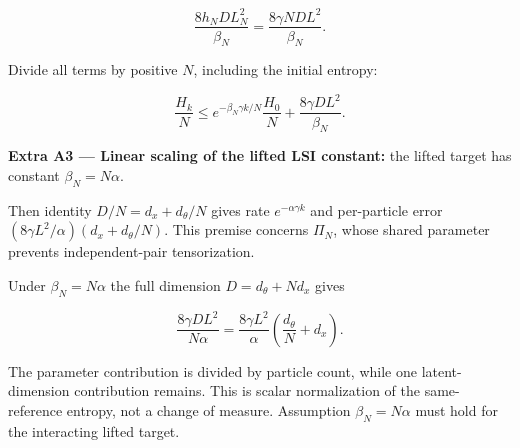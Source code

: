 \documentclass[11pt,a4paper]{report}
\begin{document}
\[\frac{8h_NDL_N^2}{\beta_N}
=\frac{8\gamma NDL^2}{\beta_N}.\]

Divide all terms by positive \(N\), including the initial entropy:

\[\frac{H_k}N\le e^{-\beta_N\gamma k/N}\frac{H_0}N
+\frac{8\gamma DL^2}{\beta_N}.\]

\textbf{Extra A3 — Linear scaling of the lifted LSI constant:} the lifted target has constant \(\beta_N=N\alpha\).



Then identity \(D/N=d_x+d_\theta/N\) gives rate \(e^{-\alpha\gamma k}\) and per-particle error \((8\gamma L^2/\alpha)(d_x+d_\theta/N)\). This premise concerns \(\Pi_N\), whose shared parameter prevents independent-pair tensorization.



Under \(\beta_N=N\alpha\) the full dimension \(D=d_\theta+Nd_x\) gives

\[\frac{8\gamma DL^2}{N\alpha}
=\frac{8\gamma L^2}{\alpha}\left(\frac{d_\theta}{N}+d_x\right).\]

The parameter contribution is divided by particle count, while one latent-dimension contribution remains. This is scalar normalization of the same-reference entropy, not a change of measure. Assumption \(\beta_N=N\alpha\) must hold for the interacting lifted target.
\end{document}

